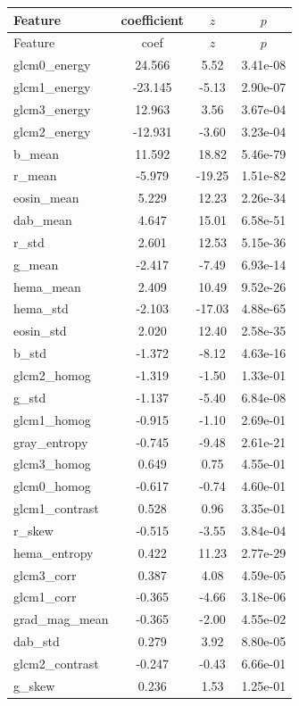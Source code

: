 \begin{longtable}{lccc}\toprule
Feature & coefficient & $z$ & $p$ \\
\midrule
\endfirsthead
\toprule Feature & coef & $z$ & $p$ \\ \midrule \endhead
glcm0\_energy & 24.566 & 5.52 & 3.41e-08 \\
glcm1\_energy & -23.145 & -5.13 & 2.90e-07 \\
glcm3\_energy & 12.963 & 3.56 & 3.67e-04 \\
glcm2\_energy & -12.931 & -3.60 & 3.23e-04 \\
b\_mean & 11.592 & 18.82 & 5.46e-79 \\
r\_mean & -5.979 & -19.25 & 1.51e-82 \\
eosin\_mean & 5.229 & 12.23 & 2.26e-34 \\
dab\_mean & 4.647 & 15.01 & 6.58e-51 \\
r\_std & 2.601 & 12.53 & 5.15e-36 \\
g\_mean & -2.417 & -7.49 & 6.93e-14 \\
hema\_mean & 2.409 & 10.49 & 9.52e-26 \\
hema\_std & -2.103 & -17.03 & 4.88e-65 \\
eosin\_std & 2.020 & 12.40 & 2.58e-35 \\
b\_std & -1.372 & -8.12 & 4.63e-16 \\
glcm2\_homog & -1.319 & -1.50 & 1.33e-01 \\
g\_std & -1.137 & -5.40 & 6.84e-08 \\
glcm1\_homog & -0.915 & -1.10 & 2.69e-01 \\
gray\_entropy & -0.745 & -9.48 & 2.61e-21 \\
glcm3\_homog & 0.649 & 0.75 & 4.55e-01 \\
glcm0\_homog & -0.617 & -0.74 & 4.60e-01 \\
glcm1\_contrast & 0.528 & 0.96 & 3.35e-01 \\
r\_skew & -0.515 & -3.55 & 3.84e-04 \\
hema\_entropy & 0.422 & 11.23 & 2.77e-29 \\
glcm3\_corr & 0.387 & 4.08 & 4.59e-05 \\
glcm1\_corr & -0.365 & -4.66 & 3.18e-06 \\
grad\_mag\_mean & -0.365 & -2.00 & 4.55e-02 \\
dab\_std & 0.279 & 3.92 & 8.80e-05 \\
glcm2\_contrast & -0.247 & -0.43 & 6.66e-01 \\
g\_skew & 0.236 & 1.53 & 1.25e-01 \\

\end{longtable}
